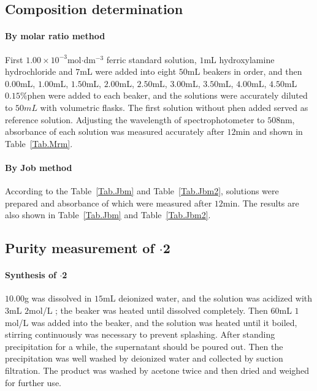 \subsection{Composition determination}

\paragraph{By molar ratio method}
First $1.00\times10^{-3}$mol$\cdot$dm$^{-3}$ ferric standard solution, $1$mL hydroxylamine hydrochloride and $7$mL  were added into eight $50$mL beakers in order, and then $0.00$mL, $1.00$mL, $1.50$mL, $2.00$mL, $2.50$mL, $3.00$mL, $3.50$mL, $4.00$mL, $4.50$mL $0.15\%$phen were added to each beaker, and the solutions were accurately diluted to $50mL$ with volumetric flasks. The first solution without phen added served as reference solution. Adjusting the wavelength of spectrophotometer to $508$nm, absorbance of each solution was measured accurately after $12$min and shown in Table~\ref{Tab.Mrm}.

\paragraph{By Job method}
According to the Table~\ref{Tab.Jbm} and Table~\ref{Tab.Jbm2}, solutions were prepared and absorbance of which were measured after $12$min. The results are also shown in Table~\ref{Tab.Jbm} and Table~\ref{Tab.Jbm2}.


\subsection{Purity measurement of $\cdot$2}

\paragraph{Synthesis of $\cdot$2}
$10.00$g  was dissolved in $15$mL deionized water, and the solution was acidized with $3$mL $2$mol/L ; the beaker was heated until  dissolved completely. Then $60$mL $1$mol/L  was added into the beaker, and the solution was heated until it boiled, stirring continuously was necessary to prevent splashing. After standing precipitation for a while, the supernatant should be poured out. Then the precipitation was well washed by deionized water and collected by suction filtration. The product was washed by acetone twice and then dried and weighed for further use.

